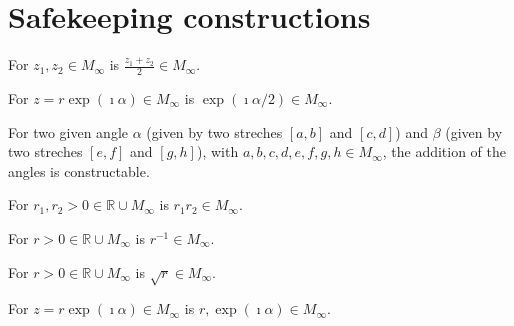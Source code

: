 \section{Safekeeping constructions}

\begin{lemma}
    \label{lem:construction_midpoint}
    For $z_1, z_2 \in M_{\infty}$ is $\frac{z_1 + z_2}{2} \in M_{\infty}$.
\end{lemma}

\begin{lemma}
    \label{lem:construction_halving_angle}
    For $z = r \exp(\imath \alpha) \in M_{\infty}$ is $\exp(\imath \alpha / 2) \in M_{\infty}$.
\end{lemma}


\begin{lemma}
    \label{lem:construction_add_angle}
    For two given angle $\alpha$ (given by two streches $[a,b]$ and $[c,d]$) and $\beta$ (given by two streches $[e,f]$ and $[g,h]$), with $ a,b,c,d,e,f,g,h \in M_{\infty}$, the addition of the angles is constructable.
\end{lemma}

\begin{lemma}
    \label{lem:construction_mult_pos_real}
    For $r_1, r_2 > 0 \in \mathbb{R}\cup M_{\infty}$ is $r_1 r_2 \in M_{\infty}$.
\end{lemma}

\begin{lemma}
    \label{lem:construction_inv_pos_real}
    For $r > 0\in \mathbb{R}\cup M_{\infty}$ is $r^{-1} \in M_{\infty}$.
\end{lemma}

\begin{lemma}
    \label{lem:construction_sqrt_pos_real}
    For $r > 0 \in \mathbb{R}\cup M_{\infty}$ is $\sqrt{r} \in M_{\infty}$.
\end{lemma}

\begin{lemma}
    \label{lem:construction_polar}
    For $z = r \exp(\imath \alpha) \in M_{\infty}$ is $r, \allowbreak \exp(\imath \alpha) \in M_{\infty}$.
\end{lemma}

